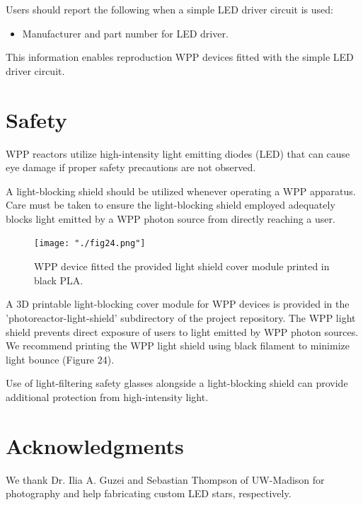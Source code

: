 \documentclass[11pt]{article}
\let\stdsection\section
\renewcommand\section{\clearpage\stdsection}
\begin{document}
Users should report the following when a simple LED driver circuit is used:

\begin{itemize}
	\item Manufacturer and part number for LED driver.
\end{itemize}

This information enables reproduction WPP devices fitted with the simple LED driver circuit.

\section{Safety}

WPP reactors utilize high-intensity light emitting diodes (LED) that can cause eye damage if proper safety precautions are not observed.

A light-blocking shield should be utilized whenever operating a WPP apparatus. 
Care must be taken to ensure the light-blocking shield employed adequately blocks light emitted by a WPP photon source from directly reaching a user.

\begin{figure}[H]
	\centering
	\texttt{[image: "./fig24.png"]}
	\caption{WPP device fitted the provided light shield cover module printed in black PLA.}
\end{figure}

A 3D printable light-blocking cover module for WPP devices is provided in the 'photoreactor-light-shield' subdirectory of the project repository.
The WPP light shield prevents direct exposure of users to light emitted by WPP photon sources. 
We recommend printing the WPP light shield using black filament to minimize light bounce (Figure 24).

Use of light-filtering safety glasses alongside a light-blocking shield can provide additional protection from high-intensity light.

\section{Acknowledgments}

We thank Dr. Ilia A. Guzei and Sebastian Thompson of UW-Madison for photography and help fabricating custom LED stars, respectively. 
\end{document}
